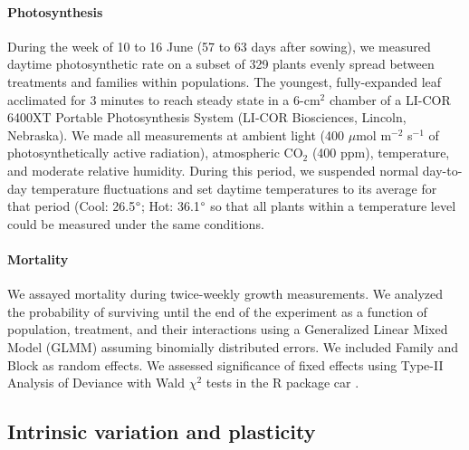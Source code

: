 \documentclass[11pt, oneside]{article}
\newcommand{\pkg}[1]{{\fontseries{b}\selectfont #1}}
\begin{document}
\paragraph{Photosynthesis}
During the week of 10 to 16 June (57 to 63 days after sowing), we measured daytime photosynthetic rate on a subset of 329 plants evenly spread between treatments and families within populations. The youngest, fully-expanded leaf acclimated for 3 minutes to reach steady state in a 6-cm$^2$ chamber of a LI-COR 6400XT Portable Photosynthesis System (LI-COR Biosciences, Lincoln, Nebraska). We made all measurements at ambient light (400 $\mu$mol m$^{-2}$ s$^{-1}$ of photosynthetically active radiation), atmospheric CO$_2$ (400 ppm), temperature, and moderate relative humidity. During this period, we suspended normal day-to-day temperature fluctuations and set daytime temperatures to its average for that period (Cool: 26.5$\degree$; Hot: 36.1$\degree$ so that all plants within a temperature level could be measured under the same conditions. %


\paragraph{Mortality}
We assayed mortality during twice-weekly growth measurements. We analyzed the probability of surviving until the end of the experiment as a function of population, treatment, and their interactions using a Generalized Linear Mixed Model (GLMM) assuming binomially distributed errors. We included Family and Block as random effects. We assessed significance of fixed effects using Type-II Analysis of Deviance with Wald $\chi ^2$ tests in the R package \pkg{car} \citep{Fox_Weisberg_2011}. 


\subsection*{Intrinsic variation and plasticity}
\end{document}
